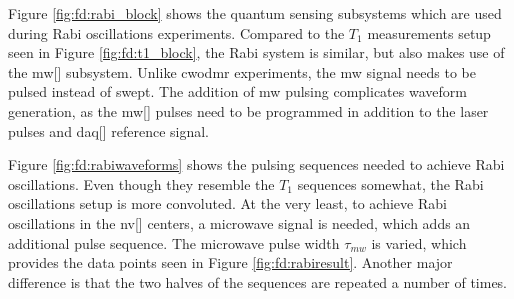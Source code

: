 Figure \ref{fig:fd:rabi_block} shows the quantum sensing subsystems which are used during Rabi oscillations experiments. Compared to the $T_1$ measurements setup seen in Figure \ref{fig:fd:t1_block}, the Rabi system is similar, but also makes use of the \gls{mw}[] subsystem. Unlike \gls{cwodmr} experiments, the \gls{mw} signal needs to be pulsed instead of swept. The addition of \gls{mw} pulsing complicates waveform generation, as the \gls{mw}[] pulses need to be programmed in addition to the laser pulses and \gls{daq}[] reference signal.

Figure \ref{fig:fd:rabiwaveforms} shows the pulsing sequences needed to achieve Rabi oscillations. Even though they resemble the $T_1$ sequences somewhat, the Rabi oscillations setup is more convoluted. At the very least, to achieve Rabi oscillations in the \gls{nv}[] centers, a microwave signal is needed, which adds an additional pulse sequence. The microwave pulse width $\tau_{mw}$ is varied, which provides the data points seen in Figure \ref{fig:fd:rabiresult}. Another major difference is that the two halves of the sequences are repeated a number of times.

